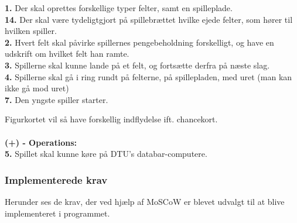     \textbf{1.} Der skal oprettes forskellige typer felter, samt en spilleplade. 
    \\
    \textbf{14.} Der skal være tydeligtgjort på spillebrættet hvilke ejede felter, som hører til hvilken spiller. 
    \\
    \textbf{2.} Hvert felt skal påvirke spillernes pengebeholdning forskelligt, og have en udskrift om hvilket felt han ramte. 
    \\
    \textbf{3.} Spillerne skal kunne lande på et felt, og fortsætte derfra på næste slag. 
    \\
    \textbf{4.} Spillerne skal gå i ring rundt på felterne, på spillepladen, med uret (man kan ikke gå mod uret) 
    \\
    \textbf{7.} Den yngste spiller starter. 

    
    Figurkortet vil så have forskellig indflydelse ift. chancekort.
\\\\\textbf{(+) - Operations:}\\
    \textbf{5.} Spillet skal kunne køre på DTU’s databar-computere. 
    \\

    \pagebreak
\subsubsection{Implementerede krav}

Herunder ses de krav, der ved hjælp af MoSCoW er blevet udvalgt til at blive implementeret i programmet. 
\\

